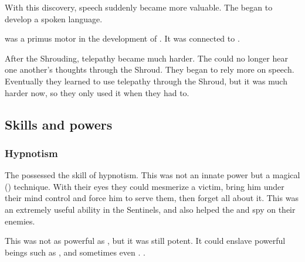 With this discovery, speech suddenly became more valuable. 
The \ophidians{} began to develop a spoken language. 

 was a primus motor in the development of \TrueDraconic. 
It was connected to . 

After the Shrouding, telepathy became much harder. 
The \ophidians could no longer hear one another's thoughts through the Shroud. 
They began to rely more on speech. 
Eventually they learned to use telepathy through the Shroud, but it was much harder now, so they only used it when they had to. 









\subsection{Skills and powers}





\subsubsection{Hypnotism}
The \ophidians possessed the skill of hypnotism.
This was not an innate power but a magical () technique. 
With their eyes they could mesmerize a victim, bring him under their mind control and force him to serve them, then forget all about it. 
This was an extremely useful ability in the Sentinels, and also helped the \ophidians {} and spy on their enemies. 

This was not as powerful as , but it was still potent. 
It could enslave powerful beings such as \aryothim, and sometimes even \resphain.
\Ophidians {}. 






